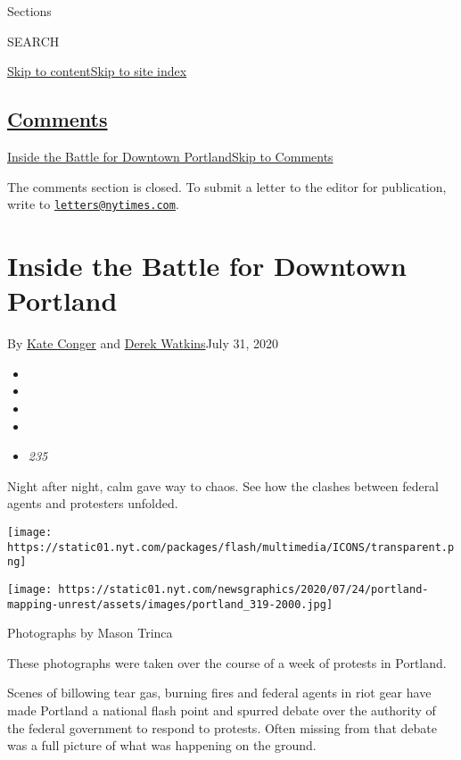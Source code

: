 Sections

SEARCH

\protect\hyperlink{site-content}{Skip to
content}\protect\hyperlink{site-index}{Skip to site index}

\hypertarget{comments}{%
\subsection{\texorpdfstring{\protect\hyperlink{commentsContainer}{Comments}}{Comments}}\label{comments}}

\href{}{Inside the Battle for Downtown Portland}\href{}{Skip to
Comments}

The comments section is closed. To submit a letter to the editor for
publication, write to
\href{mailto:letters@nytimes.com}{\nolinkurl{letters@nytimes.com}}.

\hypertarget{inside-the-battle-for-downtown-portland}{%
\section{Inside the Battle for Downtown
Portland}\label{inside-the-battle-for-downtown-portland}}

By \href{https://www.nytimes.com/by/kate-conger}{Kate Conger} and
\href{https://www.nytimes.com/by/derek-watkins}{Derek Watkins}July 31,
2020

\begin{itemize}
\item
\item
\item
\item
\item
  \emph{235}
\end{itemize}

Night after night, calm gave way to chaos. See how the clashes between
federal agents and protesters unfolded.

\texttt{[image: https://static01.nyt.com/packages/flash/multimedia/ICONS/transparent.png]}

\texttt{[image: https://static01.nyt.com/newsgraphics/2020/07/24/portland-mapping-unrest/assets/images/portland\_319-2000.jpg]}

Photographs by Mason Trinca

These photographs were taken over the course of a week of protests in
Portland.

Scenes of billowing tear gas, burning fires and federal agents in riot
gear have made Portland a national flash point and spurred debate over
the authority of the federal government to respond to protests. Often
missing from that debate was a full picture of what was happening on the
ground.

